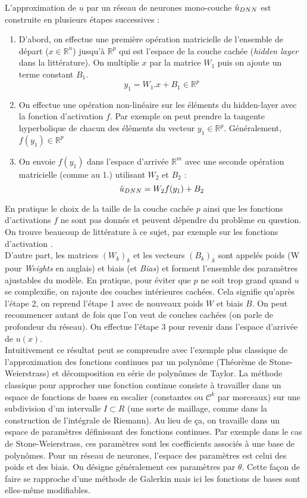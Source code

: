 L'approximation de $u$ par un réseau de neurones mono-couche $\Tilde{u}_{DNN}$ est construite en plusieurs étapes successives : 
\begin{enumerate}
    \item D'abord, on effectue une première opération matricielle de l'ensemble de départ ($x\in \mathbb{R}^n$) jusqu'à $\mathbb{R}^p$ qui est l'espace de la couche cachée (\textit{hidden layer} dans la littérature). On multiplie $x$ par la matrice $W_1$ puis on ajoute un terme constant $B_1$. 
    $$ y_1 = W_1 . x + B_1 \in \mathbb{R}^p$$
    \item On effectue une opération non-linéaire sur les éléments du hidden-layer avec la fonction d'activation $f$. Par exemple on peut prendre la tangente hyperbolique de chacun des éléments du vecteur $y_1 \in \mathbb{R}^p$. Généralement, $f(y_1) \in \mathbb{R}^p$ 
    \item On envoie $f(y_1)$ dans l'espace d'arrivée $\mathbb{R}^m$ avec une seconde opération matricielle (comme au 1.) utilisant $W_2$ et $B_2$ :
    $$ \Tilde{u}_{DNN} = W_2 f(y_1) + B_2 $$
\end{enumerate}
En pratique le choix de la taille de la couche cachée $p$ ainsi que les fonctions d'activations $f$ ne sont pas donnés et peuvent dépendre du problème en question. On trouve beaucoup de littérature à ce sujet, par exemple sur les fonctions d'activation \cite{leshnoMultilayerFeedforwardNetworks1993}.\\

D'autre part, les matrices $(W_k)_k$ et les vecteurs $(B_k)_k$ sont appelés poids (W pour \textit{Weights} en anglais) et biais (et \textit{Bias}) et forment l'ensemble des paramètres ajustables du modèle. En pratique, pour éviter que $p$ ne soit trop grand quand $u$ se complexifie, on rajoute des couches intérieures \og cachées\fg{}. Cela signifie qu'après l'étape 2, on reprend l'étape 1 avec de nouveaux poids $W$ et biais $B$. On peut recommencer autant de fois que l'on veut de couches cachées (on parle de profondeur du réseau). On effectue l'étape 3 pour revenir dans l'espace d'arrivée de $u(x)$. \\

Intuitivement ce résultat peut se comprendre avec l'exemple plus classique de l'approximation des fonctions continues par un polynôme (Théorème de Stone-Weierstrass) et décomposition en série de polynômes de Taylor. La méthode classique pour approcher une fonction continue consiste à travailler dans un espace de fonctions de bases en escalier (constantes ou $\mathcal{C}^k$ par morceaux) sur une subdivision d'un intervalle  $I \subset R$ (une sorte de maillage, comme dans la construction de l'intégrale de Riemann). Au lieu de ça, on travaille dans un espace de paramètres définissant des fonctions continues. Par exemple dans le cas de Stone-Weierstrass, ces paramètres sont les coefficients associés à une base de polynômes. Pour un réseau de neurones, l'espace des paramètres est celui des poids et des biais. On désigne généralement ces paramètres par $\theta$. Cette façon de faire se rapproche d'une méthode de Galerkin mais ici les fonctions de bases sont elles-même modifiables.\\

